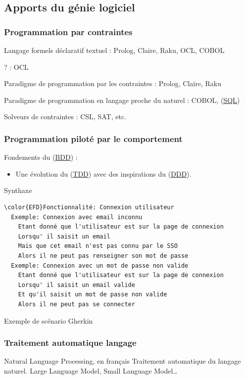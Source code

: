 \documentclass[a4paper,12pt]{article}
\begin{document}
\subsection{Apports du génie logiciel}
\label{sec:org8d45833}
\subsubsection{Programmation par contraintes}
\label{sec:org07a17d7}
Langage formels déclaratif textuel : Prolog, Claire, Raku, OCL, COBOL

? : OCL

Paradigme de programmation par les contraintes : Prolog, Claire, Raku

Paradigme de programmation en langage proche du naturel : COBOL,  (\protect\hyperlink{gls-4}{\label{gls-4-use-1}SQL})

Solveurs de contraintes : CSL, SAT, etc.
\subsubsection{Programmation piloté par le comportement}
\label{sec:org5f6b9c1}
Fondements du  (\protect\hyperlink{gls-5}{\label{gls-5-use-1}BDD}) :
\begin{itemize}
\item Une évolution du  (\protect\hyperlink{gls-6}{\label{gls-6-use-1}TDD}) avec des inspirations du  (\protect\hyperlink{gls-7}{\label{gls-7-use-1}DDD}).
\end{itemize}

Synthaxe

\begin{listing}[htbp]
\begin{Code}
\begin{Verbatim}
\color{EFD}Fonctionnalité: Connexion utilisateur
  Exemple: Connexion avec email inconnu
    Etant donné que l'utilisateur est sur la page de connexion
    Lorsqu' il saisit un email
    Mais que cet email n'est pas connu par le SSO
    Alors il ne peut pas renseigner son mot de passe
  Exemple: Connexion avec un mot de passe non valide
    Etant donné que l'utilisateur est sur la page de connexion
    Lorsqu' il saisit un email valide
    Et qu'il saisit un mot de passe non valide
    Alors il ne peut pas se connecter
\end{Verbatim}
\end{Code}
\caption{\label{lst:org0724d20}Exemple de scénario Gherkin}
\end{listing}
\subsubsection{Traitement automatique langage}
\label{sec:org3a2bf80}
Natural Language Processing, en français Traitement automatique du langage naturel.
Large Language Model, Small Language Model\ldots{}
\end{document}

